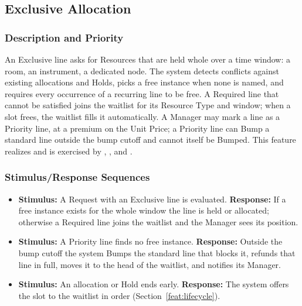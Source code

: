 \subsection{Exclusive Allocation}\label{feat:exclusive}

\subsubsection{Description and Priority}
An Exclusive line asks for Resources that are held whole over a time window: a room, an instrument, a dedicated node. The system detects conflicts against existing allocations and Holds, picks a free instance when none is named, and requires every occurrence of a recurring line to be free. A Required line that cannot be satisfied joins the waitlist for its Resource Type and window; when a slot frees, the waitlist fills it automatically. A Manager may mark a line as a Priority line, at a premium on the Unit Price; a Priority line can Bump a standard line outside the bump cutoff and cannot itself be Bumped. This feature realizes  and is exercised by , , and . 

\subsubsection{Stimulus/Response Sequences}
\begin{itemize}
  \item \textbf{Stimulus:} A Request with an Exclusive line is evaluated. \textbf{Response:} If a free instance exists for the whole window the line is held or allocated; otherwise a Required line joins the waitlist and the Manager sees its position.
  \item \textbf{Stimulus:} A Priority line finds no free instance. \textbf{Response:} Outside the bump cutoff the system Bumps the standard line that blocks it, refunds that line in full, moves it to the head of the waitlist, and notifies its Manager.
  \item \textbf{Stimulus:} An allocation or Hold ends early. \textbf{Response:} The system offers the slot to the waitlist in order (Section~\ref{feat:lifecycle}).
\end{itemize}

